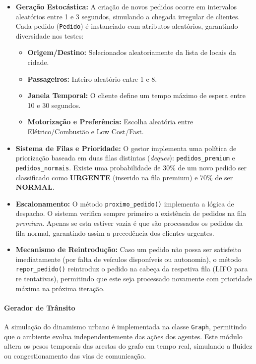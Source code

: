 \documentclass[11pt, a4paper, fleqn]{article}
\begin{document}
	\begin{itemize}
		\item \textbf{Geração Estocástica:} A criação de novos pedidos ocorre em intervalos aleatórios entre 1 e 3 segundos, simulando a chegada irregular de clientes. Cada pedido (\texttt{Pedido}) é instanciado com atributos aleatórios, garantindo diversidade nos testes:
		\begin{itemize}
			\item \textbf{Origem/Destino:} Selecionados aleatoriamente da lista de locais da cidade.
			\item \textbf{Passageiros:} Inteiro aleatório entre 1 e 8.
			\item \textbf{Janela Temporal:} O cliente define um tempo máximo de espera entre 10 e 30 segundos.
			\item \textbf{Motorização e Preferência:} Escolha aleatória entre Elétrico/Combustão e Low Cost/Fast.
		\end{itemize}
		
		\item \textbf{Sistema de Filas e Prioridade:} O gestor implementa uma política de priorização baseada em duas filas distintas (\textit{deques}): \texttt{pedidos\_premium} e \texttt{pedidos\_normais}.
		Existe uma probabilidade de 30\% de um novo pedido ser classificado como \textbf{URGENTE} (inserido na fila premium) e 70\% de ser \textbf{NORMAL}.
		
		\item \textbf{Escalonamento:} O método \texttt{proximo\_pedido()} implementa a lógica de despacho. O sistema verifica sempre primeiro a existência de pedidos na fila \textit{premium}. Apenas se esta estiver vazia é que são processados os pedidos da fila normal, garantindo assim a precedência dos clientes urgentes.
		
		\item \textbf{Mecanismo de Reintrodução:} Caso um pedido não possa ser satisfeito imediatamente (por falta de veículos disponíveis ou autonomia), o método \texttt{repor\_pedido()} reintroduz o pedido na cabeça da respetiva fila (LIFO para re tentativas), permitindo que este seja processado novamente com prioridade máxima na próxima iteração.
	\end{itemize}
	
	\paragraph{Gerador de Trânsito}
	A simulação do dinamismo urbano é implementada na classe \texttt{Graph}, permitindo que o ambiente evolua independentemente das ações dos agentes. Este módulo altera os pesos temporais das arestas do grafo em tempo real, simulando a fluidez ou congestionamento das vias de comunicação.
	
\end{document}

